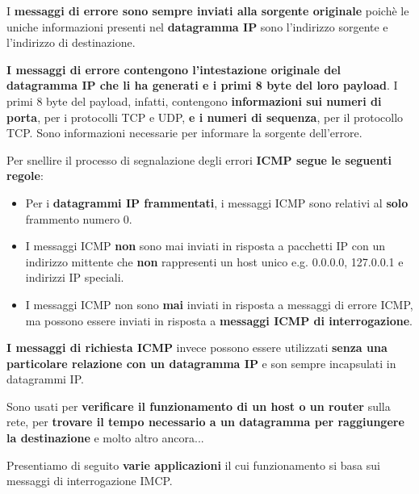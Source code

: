 \documentclass[11pt,a4paper,oneside]{book}
\theoremstyle{definition}
\begin{document}
I \textbf{messaggi di errore sono sempre inviati alla sorgente originale} poichè le uniche informazioni presenti nel \textbf{datagramma IP} sono l'indirizzo sorgente e l'indirizzo di destinazione.

\textbf{I messaggi di errore contengono l'intestazione originale del datagramma IP che li ha generati e i primi 8 byte del loro payload}. I primi 8 byte del payload, infatti, contengono \textbf{informazioni sui numeri di porta}, per i protocolli TCP e UDP, \textbf{e i numeri di sequenza}, per il protocollo TCP. Sono informazioni necessarie per informare la sorgente dell'errore.

\pagebreak

Per snellire il processo di segnalazione degli errori \textbf{ICMP segue le seguenti regole}:

\begin{itemize}
	\item Per i \textbf{datagrammi IP frammentati}, i messaggi ICMP sono relativi al \textbf{solo}
	      frammento numero 0.
	\item I messaggi ICMP \textbf{non} sono mai inviati in risposta a pacchetti IP con un indirizzo mittente che \textbf{non} rappresenti un host unico e.g. 0.0.0.0, 127.0.0.1 e indirizzi IP speciali.
	\item I messaggi ICMP non sono \textbf{mai} inviati in risposta a messaggi di errore ICMP, ma possono essere inviati in risposta a \textbf{messaggi ICMP di interrogazione}.
\end{itemize}

\textbf{I messaggi di richiesta ICMP} invece possono essere utilizzati \textbf{senza una particolare relazione con un datagramma IP} e son sempre incapsulati in datagrammi IP.

Sono usati per \textbf{verificare il funzionamento di un host o un router} sulla rete, per \textbf{trovare il tempo necessario a un datagramma per raggiungere la destinazione} e molto altro ancora...

Presentiamo di seguito \textbf{varie applicazioni} il cui funzionamento si basa sui messaggi di interrogazione IMCP.
\end{document}
